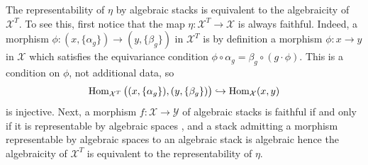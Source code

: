 \begin{remark}\label{rl-000E}\label{rmk:algebraicity-is-representability}
  The representability of \(\eta\) by algebraic stacks is equivalent to the algebraicity of \(\mathcal X^T\). To see this, first notice that the map \(\eta:\mathcal X^T\to \mathcal X\) is always faithful. Indeed, a morphism \(\phi:(x,\{\alpha_g\})\to (y,\{\beta_g\})\) in \(\mathcal X^T\) is by definition a morphism \(\phi:x\to y\) in \(\mathcal X\) which satisfies the equivariance condition \(\phi\circ \alpha_g = \beta_g \circ (g\cdot \phi)\). This is a condition on \(\phi\), not additional data, so
  \[\operatorname{Hom}_{\mathcal X^T}\big((x,\{\alpha_g\}), (y,\{\beta_g\})\big) \hookrightarrow \operatorname{Hom}_{\mathcal X}(x,y)\]
  is injective. Next, a morphism \(f:\mathcal X\to \mathcal Y\) of algebraic stacks is faithful if and only if it is representable by algebraic spaces \cite[\href{https://stacks.math.columbia.edu/tag/04Y5}{Tag 04Y5}]{stacks-project}, and a stack admitting a morphism representable by algebraic spaces to an algebraic stack is algebraic \cite[\href{https://stacks.math.columbia.edu/tag/03YS}{Tag 03YS}]{stacks-project} hence the algebraicity of \(\mathcal X^T\) is equivalent to the representability of \(\eta\).
\end{remark}
